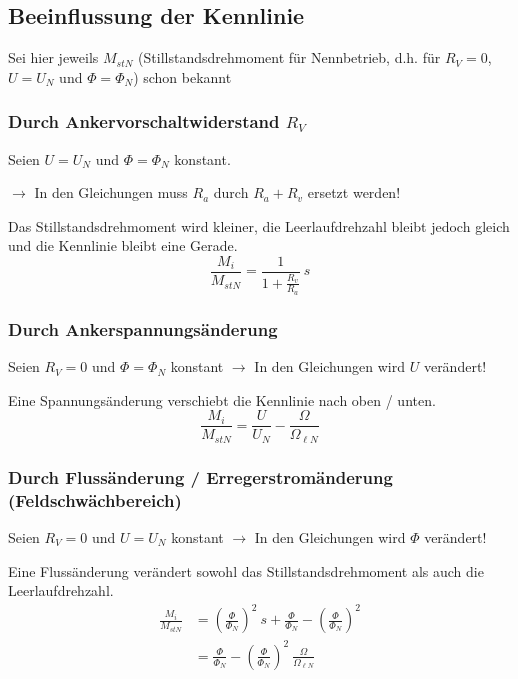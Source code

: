 \documentclass[a4paper, 11pt]{article}
\begin{document}
\subsection*{Beeinflussung der Kennlinie}
Sei hier jeweils $M_{stN}$ (Stillstandsdrehmoment für Nennbetrieb, d.h. für $R_V = 0$, $U = U_N$ und $\Phi = \Phi_N$) schon bekannt

\subsubsection*{Durch Ankervorschaltwiderstand $R_V$}
Seien $U = U_N$ und $\Phi = \Phi_N$ konstant.

\vspace{.5em}
\raggedright
$\rightarrow$ In den Gleichungen muss $R_a$ durch $R_a + R_v$ ersetzt werden!

\vspace{.5em}
\raggedright
Das Stillstandsdrehmoment wird kleiner, die Leerlaufdrehzahl bleibt jedoch gleich und die Kennlinie bleibt eine Gerade.
\[
	\frac{M_i}{M_{stN}} = \frac{1}{1 + \frac{R_v}{R_a}} ~ s
\]

\subsubsection*{Durch Ankerspannungsänderung}
Seien $R_V = 0$ und $\Phi = \Phi_N$ konstant $\rightarrow$ In den Gleichungen wird $U$ verändert!

\vspace{.5em}
\raggedright
Eine Spannungsänderung verschiebt die Kennlinie nach oben / unten.
\[
	\frac{M_i}{M_{stN}} = \frac{U}{U_N} - \frac{\Omega}{\Omega_{\ell N}}
\]

\subsubsection*{Durch Flussänderung / Erregerstromänderung (Feldschwächbereich)}
Seien $R_V = 0$ und $U = U_N$ konstant $\rightarrow$ In den Gleichungen wird $\Phi$ verändert!

\vspace{.5em}
\raggedright
Eine Flussänderung verändert sowohl das Stillstandsdrehmoment als auch die Leerlaufdrehzahl.
\begin{align*}
	\frac{M_i}{M_{stN}} &= \left(\frac{\Phi}{\Phi_N}\right)^2 ~ s + \frac{\Phi}{\Phi_N} - \left(\frac{\Phi}{\Phi_N} \right)^2 \\
		&= \frac{\Phi}{\Phi_N} - \left(\frac{\Phi}{\Phi_N}\right)^2 ~ \frac{\Omega}{\Omega_{\ell N}}
\end{align*}
\end{document}
